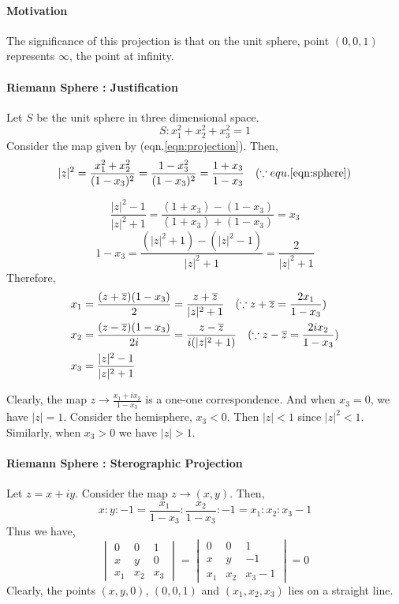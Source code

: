 \paragraph{Motivation} The significance of this projection is that on the unit sphere, point $(0,0,1)$ represents $\infty$, the point at infinity.

\paragraph{Riemann Sphere : Justification}
Let $S$ be the unit sphere in three dimensional space.
\begin{equation}
	 S : x_1^2 + x_2^2 + x_3^2 = 1 
	 \label{eqn:sphere}
\end{equation}
Consider the map given by (eqn.\ref{eqn:projection}).
Then,
	\[ |z|^2  = \frac{x_1^2+x_2^2}{(1-x_3)^2} = \frac{1-x_3^2}{(1-x_3)^2} = \frac{1+x_3}{1-x_3}\quad (\because equ. \ref{eqn:sphere}) \]

	\[ \frac{|z|^2-1}{|z|^2+1} = \frac{(1+x_3)-(1-x_3)}{(1+x_3)+(1-x_3)} = x_3  \]
	\[ 1-x_3 = \frac{(|z|^2+1) - (|z|^2-1)}{|z|^2+1} = \frac{2}{|z|^2+1} \]
Therefore,
\begin{align}
	 x_1 & = \frac{(z+\overline{z})(1-x_3)}{2} = \frac{z+\overline{z}}{|z|^2+1}\quad (\because z + \overline{z} = \frac{2x_1}{1-x_3}) \\
	 x_2 & = \frac{(z-\overline{z})(1-x_3)}{2i} = \frac{z-\overline{z}}{i(|z|^2+1)}\quad (\because z - \overline{z} = \frac{2ix_2}{1-x_3}) \\
	x_3 & = \frac{|z|^2-1}{|z|^2+1}
\end{align}

Clearly, the map $z \to \displaystyle \frac{x_1+ix_2}{1-x_3}$ is a one-one correspondence.
And when $x_3 = 0$, we have $|z| = 1$.
Consider the hemisphere, $x_3 < 0$.
Then $|z|<1$ since $|z|^2<1$.
Similarly, when $x_3 > 0$ we have $|z|>1$.

\paragraph{Riemann Sphere : Sterographic Projection}
Let $z = x+iy$.
Consider the map $z \to (x,y)$.
Then,
\[ x:y:-1 = \frac{x_1}{1-x_3} : \frac{x_2}{1-x_3} : -1 = x_1 : x_2 : x_3-1 \]
Thus we have,
\[ \begin{vmatrix} 0 & 0 & 1 \\ x & y & 0 \\ x_1 & x_2 & x_3 \end{vmatrix} = \begin{vmatrix} 0 & 0 & 1 \\ x & y & -1 \\ x_1 & x_2 & x_3-1\end{vmatrix} = 0 \]
Clearly, the points $(x,y,0)$, $(0,0,1)$ and $(x_1,x_2,x_3)$ lies on a straight line.\\

